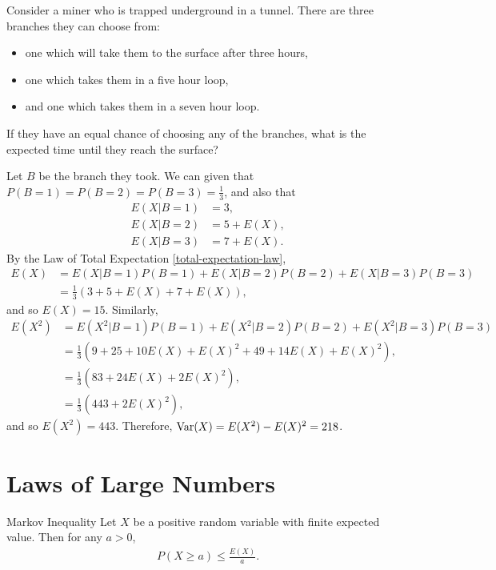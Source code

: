 \begin{exmp}
    Consider a miner who is trapped underground in a tunnel. There are three branches they can choose from:
    \begin{itemize}
        \item one which will take them to the surface after three hours,
        \item one which takes them in a five hour loop,
        \item and one which takes them in a seven hour loop.
    \end{itemize}
    If they have an equal chance of choosing any of the branches, what is the expected time until they reach the surface?

    Let $B$ be the branch they took. We can given that $P(B = 1) = P(B = 2) = P(B = 3) = \frac{1}{3}$, and also that
    \begin{align*}
        E(X|B=1) &= 3, \\
        E(X|B=2) &= 5 + E(X), \\
        E(X|B=3) &= 7 + E(X).
    \end{align*}
    By the Law of Total Expectation \ref{total-expectation-law},
    \begin{align*}
        E(X) &= E(X|B=1)P(B=1) + E(X|B=2)P(B=2) + E(X|B=3)P(B=3) \\
        &= \frac{1}{3}\left(3 + 5 + E(X) + 7 + E(X)\right),
    \end{align*}
    and so $E(X) = 15$. Similarly,
    \begin{align*}
        E(X^2) &= E(X^2|B=1)P(B=1) + E(X^2|B=2)P(B=2) + E(X^2|B=3)P(B=3) \\
        &= \frac{1}{3}\left(9 + 25 + 10E(X) + E(X)^2 + 49 + 14E(X) + E(X)^2\right), \\
        &= \frac{1}{3}\left(83 + 24E(X) + 2E(X)^2\right), \\
        &= \frac{1}{3}\left(443 + 2E(X)^2\right),
    \end{align*}
    and so $E(X^2) = 443$. Therefore, $\operatorname{Var}(X) = E(X^2) - E(X)^2 = 218$.
\end{exmp}

\section{Laws of Large Numbers}

\begin{thm}{Markov Inequality}\label{markov-inequality}\proofbreak
    Let $X$ be a positive random variable with finite expected value. Then for any $a > 0$,
    \begin{align*}
        P(X \geq a) \leq \frac{E(X)}{a}.
    \end{align*}
\end{thm}

